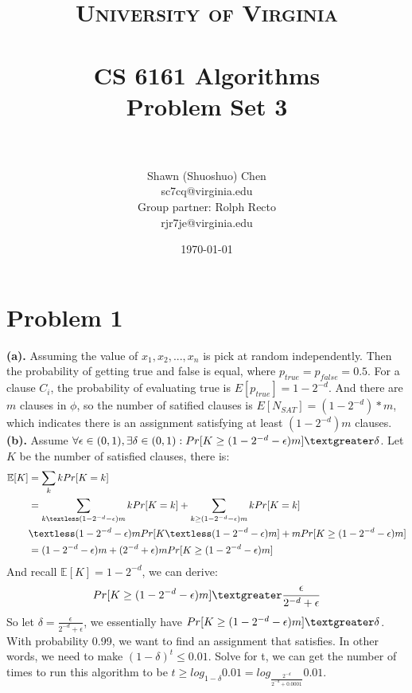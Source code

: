\documentclass[titlepage, paper=a4, fontsize=11pt]{scrartcl} %
\title{	
\normalfont \normalsize 
\textsc{University of Virginia} \\ [25pt] %
\horrule{0.5pt} \\[0.4cm] %
\huge CS 6161 Algorithms \\
\huge Problem Set 3 \\ %
\horrule{2pt} \\[0.5cm] %
}
\author{Shawn (Shuoshuo) Chen\\sc7cq@virginia.edu\\Group partner: Rolph Recto\\ rjr7je@virginia.edu} %
\date{\normalsize\today} %
\numberwithin{equation}{section} %
\numberwithin{figure}{section} %
\numberwithin{table}{section} %
\begin{document}
\maketitle %


\section*{Problem 1}
\textbf{(a).}
Assuming the value of ${x_1,x_2, ... ,x_n}$ is pick at random independently. Then the probability of getting true
and false is equal, where $p_{true} = p_{false} = 0.5$. For a clause $C_i$, the probability of evaluating true is
$E[p_{true}] = 1-2^{-d}$. And there are $m$ clauses in $\phi$, so the number of satified clauses is
$E[N_{SAT}] = (1-2^{-d}) * m$, which indicates there is an assignment satisfying at least $(1-2^{-d})m$ clauses.
\\

\textbf{(b).}
Assume $\forall \epsilon \in (0,1), \exists \delta \in (0,1): Pr[K \geq (1-2^{-d}-\epsilon)m] \textgreater \delta$.
Let $K$ be the number of satisfied clauses, there is:
\begin{align*} 
\begin{split}
\mathbb{E}[K] &= \sum_{k} kPr[K=k] \\
&= \sum_{k \textless (1-2^{-d}-\epsilon)m} kPr[K=k] + \sum_{k \geq (1-2^{-d}-\epsilon)m} kPr[K=k] \\
&\textless (1-2^{-d}-\epsilon)mPr[K \textless (1-2^{-d}-\epsilon)m] + mPr[K \geq (1-2^{-d}-\epsilon)m] \\
&= (1-2^{-d}-\epsilon)m + (2^{-d}+\epsilon)mPr[K \geq (1-2^{-d}-\epsilon)m] \\
\end{split}
\end{align*}
And recall $\mathbb{E}[K]=1-2^{-d}$, we can derive:
\begin{align*} 
\begin{split}
Pr[K \geq (1-2^{-d}-\epsilon)m] \textgreater \frac{\epsilon}{2^{-d}+\epsilon}
\end{split}
\end{align*}
So let $\delta = \frac{\epsilon}{2^{-d}+\epsilon}$, we essentially have $Pr[K \geq (1-2^{-d}-\epsilon)m] \textgreater \delta$.
With probability 0.99, we want to find an assignment that satisfies. In other words, we need to make $(1-\delta)^t  \leq 0.01$. Solve for t, we can get the number of times to run this algorithm to be $t \geq log_{1-\delta} 0.01 = log_{\frac{2^{-d}}{2^{-d}+0.0001}} 0.01$.
\\
\end{document}
